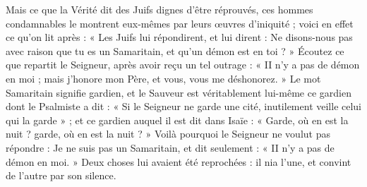  Mais ce que la Vérité dit des Juifs dignes d’être réprouvés, ces hommes condamnables le montrent eux-mêmes par leurs œuvres d’iniquité ; voici en effet ce qu’on lit après : « Les Juifs lui répondirent, et lui dirent : Ne disons-nous pas avec raison que tu es un Samaritain, et qu’un démon est en toi ? » Écoutez ce que repartit le Seigneur, après avoir reçu un tel outrage : « II n’y a pas de démon en moi ; mais j’honore mon Père, et vous, vous me déshonorez. » Le mot Samaritain signifie gardien, et le Sauveur est véritablement lui-même ce gardien dont le Psalmiste a dit : « Si le Seigneur ne garde une cité, inutilement veille celui qui la garde » ; et ce gardien auquel il est dit dans Isaïe : « Garde, où en est la nuit ? garde, où en est la nuit ? » Voilà pourquoi le Seigneur ne voulut pas répondre : Je ne suis pas un Samaritain, et dit seulement : « II n’y a pas de démon en moi. » Deux choses lui avaient été reprochées : il nia l’une, et convint de l’autre par son silence.
